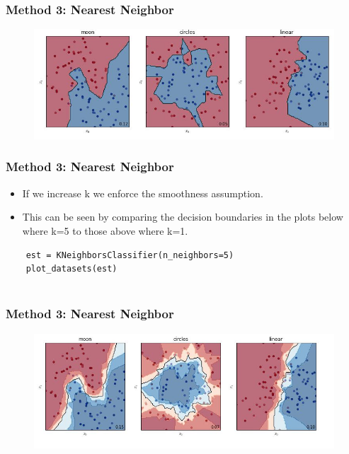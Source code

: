 \documentclass[MASTER.tex]{subfiles}
\begin{document}
\begin{frame}
	\frametitle{Method 3: Nearest Neighbor}
	\begin{figure}
		\centering
		\includegraphics[width=1.1\linewidth]{sklcass/sklclass16}
		
	\end{figure}
\end{frame}
\begin{frame}[fragile]
	\frametitle{Method 3: Nearest Neighbor}
	\Large
	\begin{itemize}
\item If we increase k we enforce the smoothness assumption. 
\item This can be seen by comparing the decision boundaries in the plots below where k=5 to those above where k=1.
	\end{itemize}
	{
		\large
	\begin{framed}
	\begin{verbatim}
	est = KNeighborsClassifier(n_neighbors=5)
	plot_datasets(est)
	
	\end{verbatim}
 \end{framed}
}
\end{frame}
\begin{frame}
	\frametitle{Method 3: Nearest Neighbor}
\begin{figure}
\centering
\includegraphics[width=1.1\linewidth]{sklcass/sklclass20}

\end{figure}


\end{frame}
\end{document}

